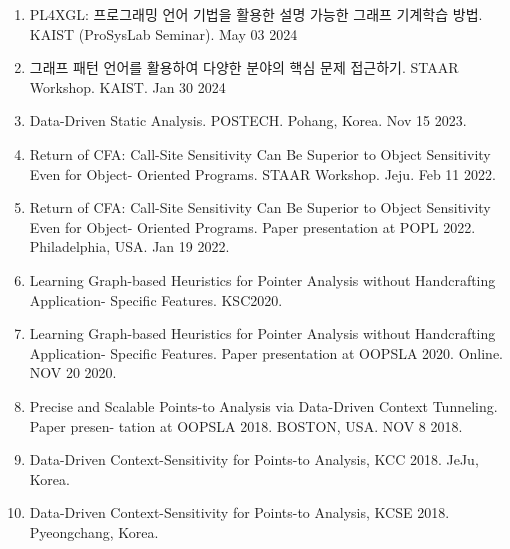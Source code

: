 \documentclass[letterpaper,11pt]{article}
\begin{document}
\begin{enumerate}
  \item{PL4XGL: 프로그래밍 언어 기법을 활용한 설명 가능한 그래프 기계학습 방법. KAIST (ProSysLab Seminar). May 03 2024}
  \item{그래프 패턴 언어를 활용하여 다양한 분야의 핵심 문제 접근하기. STAAR Workshop. KAIST. Jan 30 2024}

  \item{Data-Driven Static Analysis. POSTECH. Pohang, Korea. Nov 15 2023.}

  \item{Return of CFA: Call-Site Sensitivity Can Be Superior to Object Sensitivity Even for Object- Oriented Programs. STAAR Workshop. Jeju. Feb 11 2022.}

  \item{Return of CFA: Call-Site Sensitivity Can Be Superior to Object Sensitivity Even for Object- Oriented Programs. Paper presentation at POPL 2022. Philadelphia,  USA. Jan 19 2022.}
 
  \item{Learning Graph-based Heuristics for Pointer Analysis without Handcrafting Application- Specific Features. KSC2020.}
 
  \item{Learning Graph-based Heuristics for Pointer Analysis without Handcrafting Application- Specific Features. Paper presentation at OOPSLA 2020. Online. NOV 20 2020.}
 
  \item{Precise and Scalable Points-to Analysis via Data-Driven Context Tunneling. Paper presen- tation at OOPSLA 2018. BOSTON, USA. NOV 8 2018.}
 
  \item{Data-Driven Context-Sensitivity for Points-to Analysis, KCC 2018. JeJu, Korea.}
 
  \item{Data-Driven Context-Sensitivity for Points-to Analysis, KCSE 2018. Pyeongchang, Korea.}
\end{enumerate}

\end{document}
